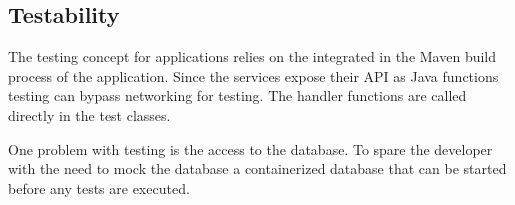 \subsection{Testability}

The testing concept for \ms{} applications relies on the integrated in the
Maven build process of the application. Since the services expose their API as
Java functions testing can bypass networking for testing. The handler functions
are called directly in the test classes.

One problem with \ms{} testing is the access to the database. To spare the
developer with the need to mock the database a containerized database that can
be started before any tests are executed.
